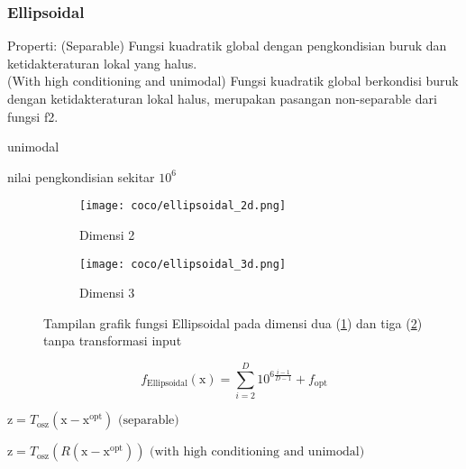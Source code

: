 \subsubsection*{Ellipsoidal}
\noindent Properti:
(Separable) Fungsi kuadratik global dengan pengkondisian buruk dan ketidakteraturan lokal yang halus.\\
(With high conditioning and unimodal) Fungsi kuadratik global berkondisi buruk dengan ketidakteraturan lokal halus, merupakan pasangan non-separable dari fungsi f2.
\begin{packed_item}
  \item unimodal
  \item nilai pengkondisian sekitar $10^6$
\end{packed_item}
\begin{figure}[H]
	\centering
	\begin{subfigure}[b]{0.4\textwidth}
		\centering
		\texttt{[image: coco/ellipsoidal\_2d.png]}
		\caption{Dimensi 2}
		\label{fig:ellipsoidal_2d}
	\end{subfigure}
	\hfill
	\begin{subfigure}[b]{0.4\textwidth}
		\centering
		\texttt{[image: coco/ellipsoidal\_3d.png]}
		\caption{Dimensi 3}
		\label{fig:ellipsoidal_3d}
	\end{subfigure}
	\caption{Tampilan grafik fungsi Ellipsoidal pada dimensi dua (\cref{fig:ellipsoidal_2d}) dan tiga (\cref{fig:ellipsoidal_3d}) tanpa transformasi input}
	\label{fig:ellipsoidal}
\end{figure}
\begin{equation}
  f_{\text{Ellipsoidal}}(\mathrm{x})=\sum_{i=2}^{D}10^{6\frac{i-1}{D-1}}+f_{\text{opt}}
\end{equation}
\begin{packed_item}
    \item $\mathrm{z}=T_{\text{osz}}(\mathrm{x}-\mathrm{x}^{\text{opt}})\text{ (separable)}$\\
    \item $\mathrm{z}=T_{\text{osz}}(R(\mathrm{x}-\mathrm{x}^{\text{opt}}))\text{ (with high conditioning and unimodal)}$
\end{packed_item}


